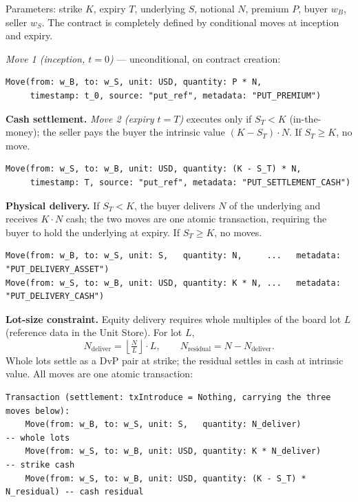 \noindent Parameters: strike $K$, expiry $T$, underlying $S$, notional $N$, premium $P$, buyer $w_B$, seller $w_S$. The contract is completely defined by conditional moves at inception and expiry.

\noindent\textit{Move 1 (inception, $t=0$)} --- unconditional, on contract creation:

\begin{lstlisting}
Move(from: w_B, to: w_S, unit: USD, quantity: P * N,
     timestamp: t_0, source: "put_ref", metadata: "PUT_PREMIUM")
\end{lstlisting}

\noindent\textbf{Cash settlement.} \textit{Move 2 (expiry $t=T$)} executes only if $S_T < K$ (in-the-money); the seller pays the buyer the intrinsic value $(K-S_T)\cdot N$. If $S_T \ge K$, no move.

\begin{lstlisting}
Move(from: w_S, to: w_B, unit: USD, quantity: (K - S_T) * N,
     timestamp: T, source: "put_ref", metadata: "PUT_SETTLEMENT_CASH")
\end{lstlisting}

\noindent\textbf{Physical delivery.} If $S_T < K$, the buyer delivers $N$ of the underlying and receives $K\cdot N$ cash; the two moves are one atomic transaction, requiring the buyer to hold the underlying at expiry. If $S_T \ge K$, no moves.

\begin{lstlisting}
Move(from: w_B, to: w_S, unit: S,   quantity: N,     ...   metadata: "PUT_DELIVERY_ASSET")
Move(from: w_S, to: w_B, unit: USD, quantity: K * N, ...   metadata: "PUT_DELIVERY_CASH")
\end{lstlisting}

\noindent\textbf{Lot-size constraint.} Equity delivery requires whole multiples of the board lot $L$ (reference data in the Unit Store). For lot $L$,
\[
N_{\text{deliver}} = \left\lfloor \tfrac{N}{L} \right\rfloor \cdot L, \qquad N_{\text{residual}} = N - N_{\text{deliver}}.
\]
Whole lots settle as a DvP pair at strike; the residual settles in cash at intrinsic value. All moves are one atomic transaction:

\begin{lstlisting}
Transaction (settlement: txIntroduce = Nothing, carrying the three moves below):
    Move(from: w_B, to: w_S, unit: S,   quantity: N_deliver)            -- whole lots
    Move(from: w_S, to: w_B, unit: USD, quantity: K * N_deliver)        -- strike cash
    Move(from: w_S, to: w_B, unit: USD, quantity: (K - S_T) * N_residual) -- cash residual
\end{lstlisting}

